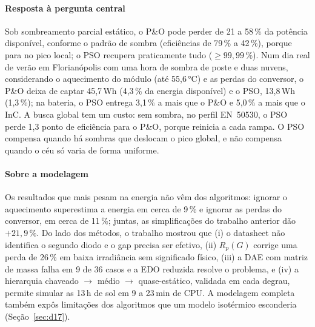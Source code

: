 \documentclass[3p,authoryear]{elsarticle}
\begin{document}
\paragraph{Resposta à pergunta central} Sob sombreamento parcial estático, o P\&O pode
perder de 21 a 58\,\% da potência disponível, conforme o padrão de sombra (eficiências de
79\,\% a 42\,\%), porque para no pico local; o PSO recupera praticamente tudo
($\ge 99{,}99\,\%$). Num dia real de verão em Florianópolis com uma hora de sombra de poste e
duas nuvens, considerando o aquecimento do módulo (até 55,6\,°C) e as perdas do conversor, o
P\&O deixa de captar 45,7\,Wh (4,3\,\% da energia disponível) e o PSO, 13,8\,Wh (1,3\,\%); na
bateria, o PSO entrega 3,1\,\% a mais que o P\&O e 5,0\,\% a mais que o InC. A busca global tem
um custo: sem sombra, no perfil EN~50530, o PSO perde 1,3 ponto de eficiência para o P\&O,
porque reinicia a cada rampa. O PSO compensa quando há sombras que deslocam o pico global, e
não compensa quando o céu só varia de forma uniforme.

\paragraph{Sobre a modelagem} Os resultados que mais pesam na energia não vêm dos
algoritmos: ignorar o aquecimento superestima a energia em cerca de 9\,\% e ignorar as perdas
do conversor, em cerca de 11\,\%; juntas, as simplificações do trabalho anterior dão
$+21{,}9\,\%$. Do lado dos métodos, o trabalho mostrou que (i) o datasheet não identifica o
segundo diodo e o gap precisa ser efetivo, (ii) $R_p(G)$ corrige uma perda de 26\,\% em baixa
irradiância sem significado físico, (iii) a DAE com matriz de massa falha em 9 de 36 casos e a
EDO reduzida resolve o problema, e (iv) a hierarquia chaveado $\to$ médio $\to$
quase-estático, validada em cada degrau, permite simular as 13\,h de sol em 9 a 23\,min de
CPU. A modelagem
completa também expôs limitações dos algoritmos que um modelo isotérmico esconderia
(Seção~\ref{sec:d17}).
\end{document}
